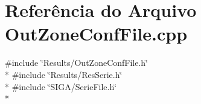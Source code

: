 \section{Referência do Arquivo Out\+Zone\+Conf\+File.\+cpp}
\label{_out_zone_conf_file_8cpp}
{\ttfamily \#include \char`\"{}Results/\+Out\+Zone\+Conf\+File.\+h\char`\"{}}\\*
{\ttfamily \#include \char`\"{}Results/\+Res\+Serie.\+h\char`\"{}}\\*
{\ttfamily \#include \char`\"{}S\+I\+G\+A/\+Serie\+File.\+h\char`\"{}}\\*

